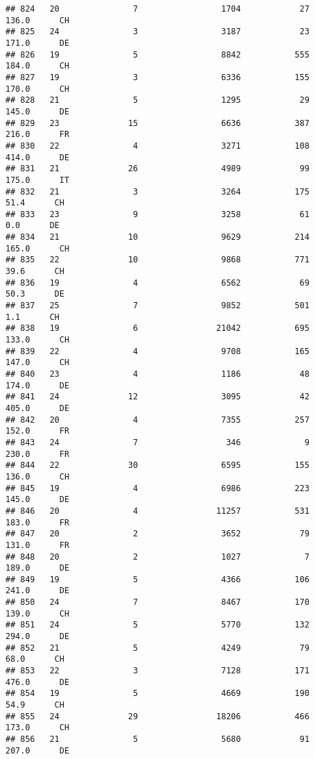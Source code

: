 \documentclass[
]{article}
\begin{document}
\begin{verbatim}
## 824   20               7                 1704            27    136.0      CH
## 825   24               3                 3187            23    171.0      DE
## 826   19               5                 8842           555    184.0      CH
## 827   19               3                 6336           155    170.0      CH
## 828   21               5                 1295            29    145.0      DE
## 829   23              15                 6636           387    216.0      FR
## 830   22               4                 3271           108    414.0      DE
## 831   21              26                 4989            99    175.0      IT
## 832   21               3                 3264           175     51.4      CH
## 833   23               9                 3258            61      0.0      DE
## 834   21              10                 9629           214    165.0      CH
## 835   22              10                 9868           771     39.6      CH
## 836   19               4                 6562            69     50.3      DE
## 837   25               7                 9852           501      1.1      CH
## 838   19               6                21042           695    133.0      CH
## 839   22               4                 9708           165    147.0      CH
## 840   23               4                 1186            48    174.0      DE
## 841   24              12                 3095            42    405.0      DE
## 842   20               4                 7355           257    152.0      FR
## 843   24               7                  346             9    230.0      FR
## 844   22              30                 6595           155    136.0      CH
## 845   19               4                 6986           223    145.0      DE
## 846   20               4                11257           531    183.0      FR
## 847   20               2                 3652            79    131.0      FR
## 848   20               2                 1027             7    189.0      DE
## 849   19               5                 4366           106    241.0      DE
## 850   24               7                 8467           170    139.0      CH
## 851   24               5                 5770           132    294.0      DE
## 852   21               5                 4249            79     68.0      CH
## 853   22               3                 7128           171    476.0      DE
## 854   19               5                 4669           190     54.9      CH
## 855   24              29                18206           466    173.0      CH
## 856   21               5                 5680            91    207.0      DE

\end{verbatim}
\end{document}
